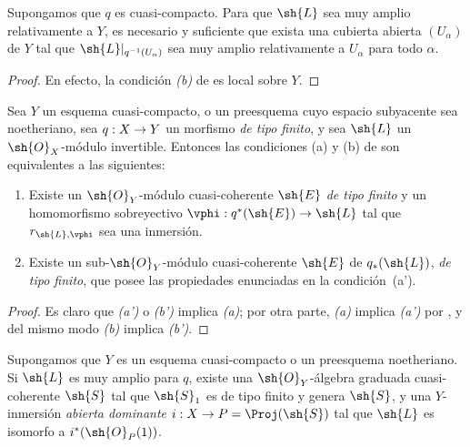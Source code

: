 \documentclass[oneside,10pt]{amsart}
\makeatletter
\newcommand{\ega@arrow}[2]{\mathchoice{#1}{#2}{#2}{#2}}
\renewcommand{\to}{\ega@arrow{\longrightarrow}{\rightarrow}}
\let\EGAOriginalLabel\label
\renewcommand{\label}[1]{\phantomsection\EGAOriginalLabel{#1}}
\makeatother
\begin{document}
\begin{corollary}[4.4.5]
\label{II.4.4.5}
Supongamos que $q$ es cuasi-compacto.
Para que $\sh{L}$ sea muy amplio relativamente a $Y$, es necesario y suficiente que exista una cubierta abierta $(U_\alpha)$ de $Y$ tal que $\sh{L}|_{q^{-1}(U_\alpha)}$ sea muy amplio relativamente a $U_\alpha$ para todo $\alpha$.
\end{corollary}

\begin{proof}
En efecto, la condición \emph{(b)} de  es local sobre $Y$.
\end{proof}

\begin{proposition}[4.4.6]
\label{II.4.4.6}
Sea $Y$ un esquema cuasi-compacto, o un preesquema cuyo espacio subyacente sea noetheriano, sea $q:X\to Y$ un morfismo \emph{de tipo finito}, y sea $\sh{L}$ un $\sh{O}_X$-módulo invertible.
Entonces las condiciones \textup{(a)} y \textup{(b)} de  son equivalentes a las siguientes:
\begin{enumerate}
  \item[\rm{(a')}] Existe un $\sh{O}_Y$-módulo cuasi-coherente $\sh{E}$ \emph{de tipo finito} y un homomorfismo sobreyectivo $\vphi:q^*(\sh{E})\to\sh{L}$ tal que $r_{\sh{L},\vphi}$ sea una inmersión.
  \item[\rm{(b')}] Existe un sub-$\sh{O}_Y$-módulo cuasi-coherente $\sh{E}$ de $q_*(\sh{L})$, \emph{de tipo finito}, que posee las propiedades enunciadas en la condición~\textup{(a')}.
\end{enumerate}
\end{proposition}

\begin{proof}
Es claro que \emph{(a')} o \emph{(b')} implica \emph{(a)};
por otra parte, \emph{(a)} implica \emph{(a')} por , y del mismo modo \emph{(b)} implica \emph{(b')}.
\end{proof}

\begin{corollary}[4.4.7]
\label{II.4.4.7}
Supongamos que $Y$ es un esquema cuasi-compacto o un preesquema noetheriano.
Si $\sh{L}$ es muy amplio para $q$, existe una $\sh{O}_Y$-álgebra graduada cuasi-coherente $\sh{S}$ tal que $\sh{S}_1$ es de tipo finito y genera $\sh{S}$, y una $Y$-inmersión \emph{abierta dominante} $i:X\to P=\Proj(\sh{S})$ tal que $\sh{L}$ es isomorfo a $i^*(\sh{O}_P(1))$.
\end{corollary}
\end{document}
